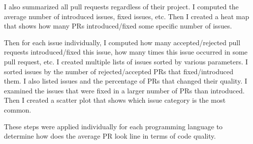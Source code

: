\documentclass[digital,oneside,oldtable,nolof,nolot,nocover]{fithesis4}
\begin{document}
I also summarized all pull requests regardless of their project. I computed the average number
of introduced issues, fixed issues, etc. Then I created a heat map that shows how many PRs
introduced/fixed some specific number of issues.

Then for each issue individually, I computed how many accepted/rejected pull
requests introduced/fixed this issue, how many times this issue occurred in
some pull request, etc. I created multiple lists of issues sorted by various parameters.
I sorted issues by the number of rejected/accepted PRs that fixed/introduced them.
I also listed issues and the percentage of PRs that changed their quality. I examined the
issues that were fixed in a larger number of PRs than introduced. Then I created a scatter plot
that shows which issue category is the most common.

These steps were applied individually for each programming language to determine
how does the average PR look line in terms of code quality.
\end{document}
